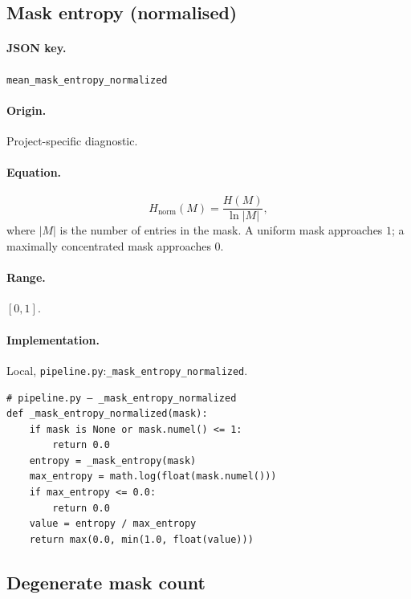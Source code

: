 \documentclass[11pt,a4paper]{article}
\newcommand{\code}[1]{\texttt{#1}}
\newcommand{\jsonkey}[1]{\texttt{#1}}
\begin{document}
\subsection{Mask entropy (normalised)}
\label{sec:entropy-norm}

\paragraph{JSON key.} \jsonkey{mean\_mask\_entropy\_normalized}

\paragraph{Origin.} Project-specific diagnostic.

\paragraph{Equation.}
\begin{equation}
  H_{\mathrm{norm}}(M) = \frac{H(M)}{\ln |M|},
  \label{eq:entropy-norm}
\end{equation}
where $|M|$ is the number of entries in the mask.  A uniform mask
approaches $1$; a maximally concentrated mask approaches $0$.

\paragraph{Range.} $[0, 1]$.

\paragraph{Implementation.} Local,
\code{pipeline.py}:\code{\_mask\_entropy\_normalized}.

\begin{verbatim}
# pipeline.py — _mask_entropy_normalized
def _mask_entropy_normalized(mask):
    if mask is None or mask.numel() <= 1:
        return 0.0
    entropy = _mask_entropy(mask)
    max_entropy = math.log(float(mask.numel()))
    if max_entropy <= 0.0:
        return 0.0
    value = entropy / max_entropy
    return max(0.0, min(1.0, float(value)))
\end{verbatim}


\subsection{Degenerate mask count}
\label{sec:degenerate}
\end{document}
